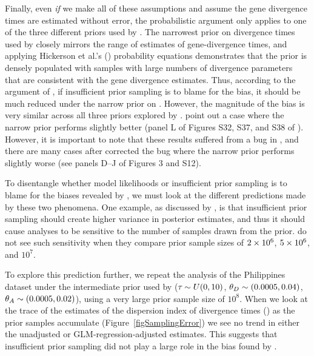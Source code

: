\documentclass[letterpaper,12pt]{article}
\begin{document}
\begin{linenumbers}
Finally, even \emph{if} we make all of these assumptions and assume the gene
divergence times are estimated without error, the probabilistic argument only
applies to one of the three different priors used by \citet{Oaks2012}.
The narrowest prior on divergence times used by \citet{Oaks2012} closely mirrors
the range of estimates of gene-divergence times, and applying Hickerson et al.'s
(\citeyear{Hickerson2013}) probability equations demonstrates that the prior
is densely populated with samples with large numbers of divergence parameters
that are consistent with the gene divergence estimates.
Thus, according to the argument of \citet{Hickerson2013}, if insufficient prior
sampling is to blame for the bias, it should be much reduced under the narrow
prior on \divt{}.
However, the magnitude of the bias is very similar across all three priors
explored by \citet{Oaks2012}.
\citet{Hickerson2013} point out a case where the narrow prior performs
slightly better (panel L of Figures S32, S37, and S38 of \citet{Oaks2012}).
However, it is important to note that these results suffered from a bug
in \msb, and there are many cases after \citet{Oaks2012} corrected the 
bug where the narrow prior performs slightly worse (see panels D--J of
Figures 3 and S12).

To disentangle whether model likelihoods or insufficient prior sampling is to
blame for the biases revealed by \citet{Oaks2012}, we must look at the
different predictions made by these two phenomena.
One example, as discussed by \citet{Oaks2012}, is that insufficient prior
sampling should create higher variance in posterior estimates, and thus it
should cause analyses to be sensitive to the number of samples drawn from the
prior.
\citet{Oaks2012} do not see such sensitivity when they compare prior sample
sizes of $2\times 10^{6}$, $5\times 10^{6}$, and $10^7$.

To explore this prediction further, we repeat the analysis of the Philippines
dataset under the intermediate prior used by \citet{Oaks2012} ($\tau_{} \sim U(0,
10)$, $\meanDescendantTheta{} \sim (0.0005, 0.04)$, $\ancestralTheta{} \sim
(0.0005, 0.02)$), using a very large prior sample size of $10^8$.
When we look at the trace of the estimates of the dispersion index of
divergence times (\vmratio{}) as the prior samples accumulate
(Figure~\ref{figSamplingError}) we see no trend in either the unadjusted or
GLM-regression-adjusted estimates.
This suggests that insufficient prior sampling did not play a large
role in the bias found by \citet{Oaks2012}.


\end{linenumbers}
\end{document}
